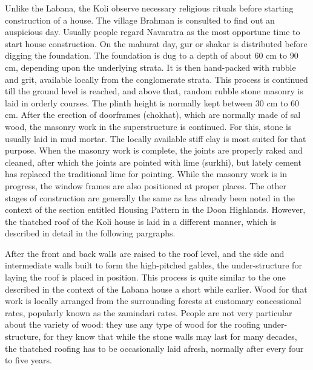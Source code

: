 Unlike the Labana, the Koli observe necessary religious rituals before starting construction of a house. The village Brahman is consulted to find out an auspicious day. Usually people regard Navaratra as the most opportune time to start house construction. On the mahurat day, gur or shakar is distributed before digging the foundation. The foundation is dug to a depth of about 60 cm to 90 cm, depending upon the underlying strata. It is then hand-packed with rubble and grit, available locally from the conglomerate strata. This process is continued till the ground level is reached, and above that, random rubble stone masonry is laid in orderly courses. The plinth height is normally kept between 30 cm to 60 cm. After the erection of doorframes (chokhat), which are normally made of sal wood, the masonry work in the superstructure is continued. For this, stone is usually laid in mud mortar. The locally available stiff clay is most suited for that purpose. When the masonry work is complete, the joints are properly raked and cleaned, after which the joints are pointed with lime (surkhi), but lately cement has replaced the traditional lime for pointing. While the masonry work is in progress, the window frames are also positioned at proper places. The other stages of construction are generally the same as has already been noted in the context of the section entitled Housing Pattern in the Doon Highlands. However, the thatched roof of the Koli house is laid in a different manner, which is described in detail in the following pargraphs.

After the front and back walls are raised to the roof level, and the side and intermediate walls built to form the high-pitched gables, the under-structure for laying the roof is placed in position. This process is quite similar to the one described in the context of the Labana house a short while earlier. Wood for that work is locally arranged from the surrounding forests at customary concessional rates, popularly known as the zamindari rates. People are not very particular about the variety of wood: they use any type of wood for the roofing under-structure, for they know that while the stone walls may last for many decades, the thatched roofing has to be occasionally laid afresh, normally after every four to five years.

